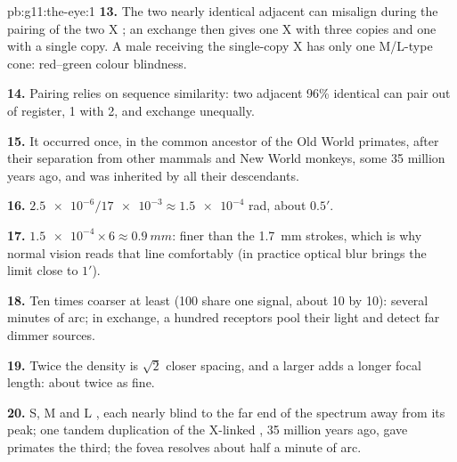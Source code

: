 \begin{solution}{pb:g11:the-eye:1}
\textbf{13.} The two nearly identical adjacent  can misalign
during the pairing of the two X ; an exchange then gives
one X with three copies and one with a single copy. A male receiving
the single-copy X has only one M/L-type cone: red--green colour
blindness.

\textbf{14.} Pairing relies on sequence similarity: two adjacent 96\%
identical  can pair out of register,  1 with  2, and
exchange unequally.

\textbf{15.} It occurred once, in the common ancestor of the Old World
primates, after their separation from other mammals and New World
monkeys, some 35 million years ago, and was inherited by all their
descendants.

\textbf{16.} $\num{2.5e-6}/\num{17e-3} \approx \num{1.5e-4}$ rad, about
$0.5'$.

\textbf{17.} $\num{1.5e-4} \times 6 \approx \qty{0.9}{mm}$: finer than
the \qty{1.7}{mm} strokes, which is why normal vision reads that line
comfortably (in practice optical blur brings the limit close to
$1'$).

\textbf{18.} Ten times coarser at least (100  share one signal,
about 10 by 10): several minutes of arc; in exchange, a hundred
receptors pool their light and detect far dimmer sources.

\textbf{19.} Twice the density is $\sqrt{2}$ closer spacing, and a
larger  adds a longer focal length: about twice as fine.

\textbf{20.} S, M and L , each nearly blind to the far end of the
spectrum away from its peak; one tandem duplication of the X-linked
 , 35 million years ago, gave primates the third; the fovea
resolves about half a minute of arc.
\end{solution}
